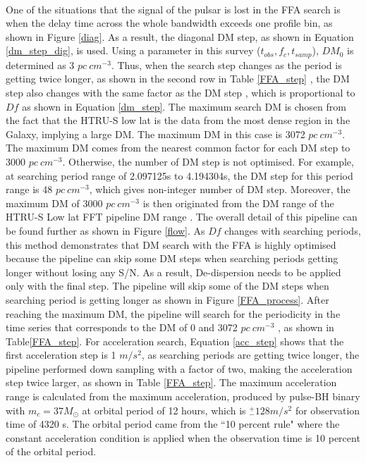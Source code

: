 \documentclass[thesis_msc.tex]{subfiles}
\begin{document}
\paragraph{} One of the situations that the signal of the pulsar is lost in the FFA search is when the delay time across the whole bandwidth exceeds one profile bin, as shown in Figure \ref{diag}. As a result, the diagonal DM step, as shown in Equation \ref{dm_step_dig}, is used. Using a parameter in this survey ($t_{obs},f_c,t_{samp}$), $DM_0$ is determined as 3 $pc~cm^{-3}$. Thus, when the search step changes as the period is getting twice longer, as shown in the second row in Table \ref{FFA_step} , the DM step also changes with the same factor as the DM step , which is proportional to $Df$ as shown in Equation \ref{dm_step}. The maximum search DM is chosen from the fact that the HTRU-S low lat is the data from the most dense region in the Galaxy, implying a large DM. The maximum DM in this case is 3072 $pc~cm^{-3}$. The maximum DM comes from the nearest common factor for each DM step to 3000 $pc~cm^{-3}$. Otherwise, the number of DM step is not optimised. For example, at searching period range of 2.097125s to 4.194304s, the DM step for this period range is 48 $pc~cm^{-3}$, which gives non-integer number of DM step.   Moreover, the maximum DM of 3000 $pc~cm^{-3}$ is then originated from the DM range of the HTRU-S Low lat FFT pipeline DM range \citep{ng2015high}. The overall detail of this pipeline can be found further as shown in Figure \ref{flow}. As $Df$ changes with searching periods, this method demonstrates that DM search with the FFA is highly optimised because the pipeline can skip some DM steps when searching periods getting longer without losing any S/N. As a result, De-dispersion needs to be applied only with the final step. The pipeline will skip some of the DM steps when searching period is getting longer as shown in Figure \ref{FFA_process}. After reaching the maximum DM, the pipeline will search for the periodicity in the time series that corresponds to the DM of 0 and 3072 $pc~cm^{-3}$ , as shown in Table\ref{FFA_step}. For acceleration search, Equation \ref{acc_step} shows that the first acceleration step is 1 $m/s^2$, as searching periods are getting twice longer, the pipeline performed down sampling with a factor of two, making the acceleration step twice larger, as shown in Table \ref{FFA_step}.  The maximum acceleration range is calculated from the maximum acceleration, produced by pulse-BH binary with $m_c=37 M_{\odot}$ at orbital period of 12 hours, which is $^+_-128 m/s^2$ for observation time of 4320 s. The orbital period came from the ``10 percent rule" where the constant acceleration condition is applied when the observation time is 10 percent of the orbital period. 
\end{document}
